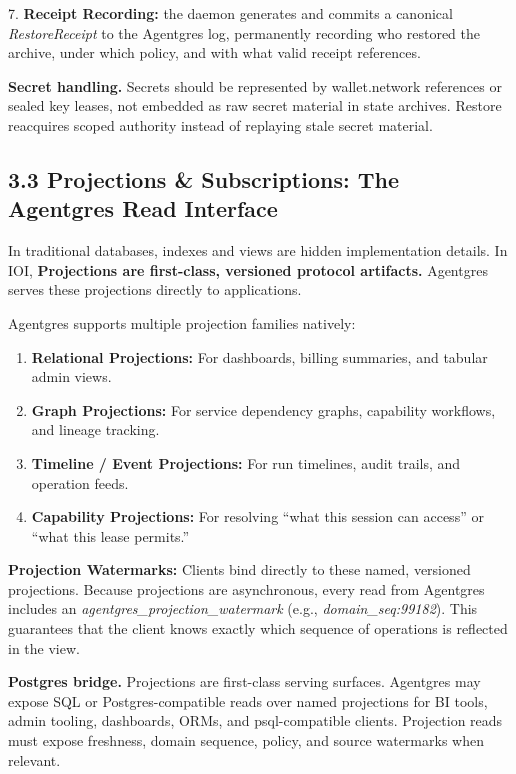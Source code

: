 \documentclass[
  11pt,
]{article}
\providecommand{\tightlist}{%
  \setlength{\itemsep}{0pt}\setlength{\parskip}{0pt}}
\begin{document}
7. \textbf{Receipt Recording:} the daemon generates and commits a
canonical \emph{RestoreReceipt} to the Agentgres log, permanently
recording who restored the archive, under which policy, and with what
valid receipt references.

\textbf{Secret handling.} Secrets should be represented by
wallet.network references or sealed key leases, not embedded as raw
secret material in state archives. Restore reacquires scoped authority
instead of replaying stale secret material.

\hypertarget{projections-subscriptions-the-agentgres-read-interface}{%
\subsection{3.3 Projections \& Subscriptions: The Agentgres Read
Interface}\label{projections-subscriptions-the-agentgres-read-interface}}

In traditional databases, indexes and views are hidden implementation
details. In IOI, \textbf{Projections are first-class, versioned protocol
artifacts.} Agentgres serves these projections directly to applications.

Agentgres supports multiple projection families natively:

\begin{enumerate}
\def\labelenumi{\arabic{enumi}.}
\tightlist
\item
  \textbf{Relational Projections:} For dashboards, billing summaries,
  and tabular admin views.
\item
  \textbf{Graph Projections:} For service dependency graphs, capability
  workflows, and lineage tracking.
\item
  \textbf{Timeline / Event Projections:} For run timelines, audit
  trails, and operation feeds.
\item
  \textbf{Capability Projections:} For resolving ``what this session can
  access'' or ``what this lease permits.''
\end{enumerate}

\textbf{Projection Watermarks:} Clients bind directly to these named,
versioned projections. Because projections are asynchronous, every read
from Agentgres includes an \emph{agentgres\_projection\_watermark}
(e.g., \emph{domain\_seq:99182}). This guarantees that the client knows
exactly which sequence of operations is reflected in the view.

\textbf{Postgres bridge.} Projections are first-class serving surfaces.
Agentgres may expose SQL or Postgres-compatible reads over named
projections for BI tools, admin tooling, dashboards, ORMs, and
psql-compatible clients. Projection reads must expose freshness, domain
sequence, policy, and source watermarks when relevant.
\end{document}
